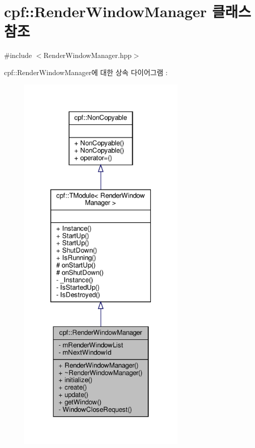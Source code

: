 \hypertarget{classcpf_1_1_render_window_manager}{}\section{cpf\+:\+:Render\+Window\+Manager 클래스 참조}
\label{classcpf_1_1_render_window_manager}


{\ttfamily \#include $<$Render\+Window\+Manager.\+hpp$>$}



cpf\+:\+:Render\+Window\+Manager에 대한 상속 다이어그램 \+: 
\nopagebreak
\begin{figure}[H]
\begin{center}
\leavevmode
\includegraphics[width=229pt]{classcpf_1_1_render_window_manager__inherit__graph}
\end{center}
\end{figure}


